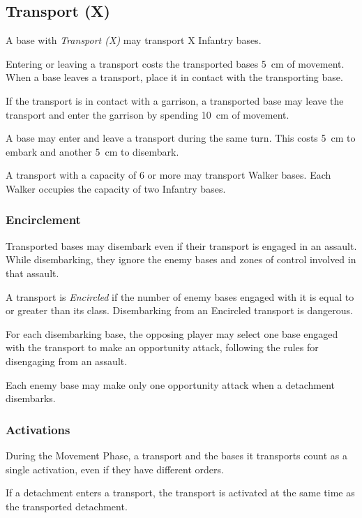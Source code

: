\subsection{Transport (X)}

A base with \textit{Transport (X)} may transport X Infantry bases.

Entering or leaving a transport costs the transported bases 5~cm of movement. When a base leaves a transport, place it in contact with the transporting base.

If the transport is in contact with a garrison, a transported base may leave the transport and enter the garrison by spending 10~cm of movement.

A base may enter and leave a transport during the same turn. This costs 5~cm to embark and another 5~cm to disembark.

A transport with a capacity of 6 or more may transport Walker bases. Each Walker occupies the capacity of two Infantry bases.

\subsubsection{Encirclement}

Transported bases may disembark even if their transport is engaged in an assault. While disembarking, they ignore the enemy bases and zones of control involved in that assault.

A transport is \textit{Encircled} if the number of enemy bases engaged with it is equal to or greater than its class. Disembarking from an Encircled transport is dangerous.

For each disembarking base, the opposing player may select one base engaged with the transport to make an opportunity attack, following the rules for disengaging from an assault.

Each enemy base may make only one opportunity attack when a detachment disembarks.

\subsubsection{Activations}

During the Movement Phase, a transport and the bases it transports count as a single activation, even if they have different orders.

If a detachment enters a transport, the transport is activated at the same time as the transported detachment.

